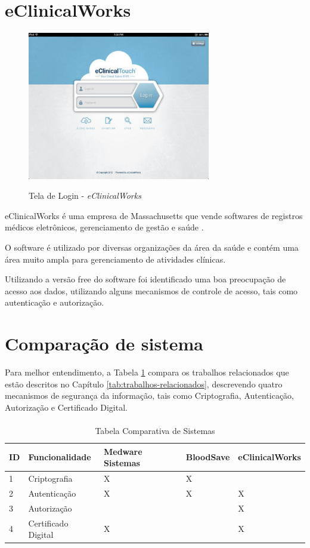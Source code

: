 \documentclass[portuguese,oneside]{tcc}
\begin{document}
\section{eClinicalWorks}

\begin{figure}[htp]
\centering
\caption{Tela de Login - \textit{eClinicalWorks}}
\includegraphics[width=8cm]{eclinicalworks}
\label{fig:eclinicalworks}
\end{figure}

eClinicalWorks é uma empresa de Massachusetts que vende softwares de registros médicos eletrônicos, gerenciamento de gestão e saúde \cite{ECLINICAL}.
 
O software é utilizado por diversas organizações da área da saúde e contém uma área muito ampla para gerenciamento de atividades clínicas.

Utilizando a versão free do software foi identificado uma boa preocupação de acesso aos dados, utilizando alguns mecanismos de controle de acesso, tais como autenticação e autorização.

\section{Comparação de sistema}
Para melhor entendimento, a Tabela \ref{tab:comparativo} compara os trabalhos relacionados que estão descritos no Capítulo \ref{tab:trabalhos-relacionados}, descrevendo quatro mecanismos de segurança da informação, tais como Criptografia, Autenticação, Autorização e Certificado Digital.

\paragraph{ }
\begin{table}[htb]
\caption{Tabela Comparativa de Sistemas}\label{tab:comparativo}	
	\begin{center}
	\begin{tabular}{lllll}
	\toprule
	ID & Funcionalidade & Medware Sistemas & BloodSave & eClinicalWorks\\ 
	\midrule
	1 & Criptografia 	& X	& X	&  		\\
	2 & Autenticação	& X 	& X	& X		\\
	3 & Autorização 	&  	&  	& X		\\
    4 & Certificado Digital 	& X 	&  	& X		\\
	\bottomrule
	\end{tabular}
	\end{center}
\end{table}
\end{document}
